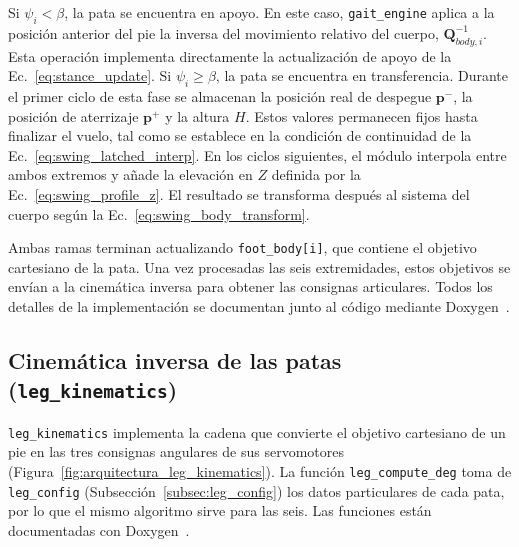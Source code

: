 Si $\psi_i<\beta$, la pata se encuentra en apoyo. En este caso,
\texttt{gait\_engine} aplica a la posición anterior del pie la inversa del
movimiento relativo del cuerpo, $\mathbf{Q}_{body,i}^{-1}$. Esta operación
implementa directamente la actualización de apoyo de la
Ec.~\ref{eq:stance_update}. Si $\psi_i\geq\beta$, la pata se encuentra en transferencia. Durante el primer
ciclo de esta fase se almacenan la posición real de despegue $\bm{p}^{-}$, la
posición de aterrizaje $\bm{p}^{+}$ y la altura $H$. Estos valores permanecen
fijos hasta finalizar el vuelo, tal como se establece en la condición de
continuidad de la Ec.~\ref{eq:swing_latched_interp}. En los ciclos
siguientes, el módulo interpola entre ambos extremos y añade la elevación en
$Z$ definida por la Ec.~\ref{eq:swing_profile_z}. El resultado se
transforma después al sistema del cuerpo según la
Ec.~\ref{eq:swing_body_transform}.

Ambas ramas terminan actualizando \texttt{foot\_body[i]}, que contiene el
objetivo cartesiano de la pata. Una vez procesadas las seis extremidades, estos
objetivos se envían a la cinemática inversa para obtener las consignas
articulares. Todos los detalles de la implementación se documentan junto al código mediante Doxygen~\cite{doxygen}.

\newpage
\subsection{Cinemática inversa de las patas (\texttt{leg\_kinematics})}
\label{subsec:leg_kinematics}

\texttt{leg\_kinematics} implementa la cadena que convierte el objetivo
cartesiano de un pie en las tres consignas angulares de sus servomotores
(Figura~\ref{fig:arquitectura_leg_kinematics}). La función
\texttt{leg\_compute\_deg} toma de \texttt{leg\_config}
(Subsección~\ref{subsec:leg_config}) los datos particulares de cada pata, por
lo que el mismo algoritmo sirve para las seis. Las funciones están documentadas con Doxygen~\cite{doxygen}.

